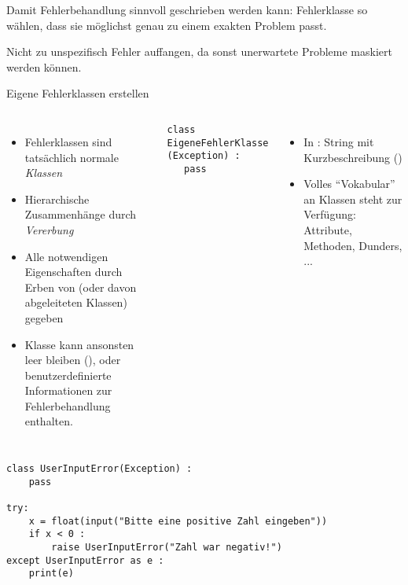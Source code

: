 
\begin{frame}[fragile]{}
%
\begin{hintbox}
Damit Fehlerbehandlung sinnvoll geschrieben werden kann: Fehlerklasse so wählen, dass sie möglichst genau zu einem exakten Problem passt.

Nicht zu unspezifisch Fehler auffangen, da sonst unerwartete Probleme maskiert werden können.
\end{hintbox}
%
\end{frame}


\begin{frame}[fragile]{Eigene Fehlerklassen erstellen}
%
\begin{columns}[T]
\begin{itemize}
\item Fehlerklassen sind tatsächlich normale \emph{Klassen}
\item Hierarchische Zusammenhänge durch \emph{Vererbung}
\item Alle notwendigen Eigenschaften durch Erben von  (oder davon abgeleiteten Klassen) gegeben
\item Klasse kann ansonsten leer bleiben (), oder benutzerdefinierte Informationen zur Fehlerbehandlung enthalten.
\end{itemize}
%
\begin{codebox}
\begin{verbatim}
class EigeneFehlerKlasse (Exception) :
   pass
\end{verbatim}
\end{codebox}
%
\begin{itemize}
\item In : String mit Kurzbeschreibung ()
\item Volles \enquote{Vokabular} an Klassen steht zur Verfügung: Attribute, Methoden, Dunders, ...
\end{itemize}
%
\end{columns}
%
\end{frame}


\begin{frame}[fragile]
%
\begin{codebox}
\begin{verbatim}
class UserInputError(Exception) :
    pass

try:
    x = float(input("Bitte eine positive Zahl eingeben"))
    if x < 0 :
        raise UserInputError("Zahl war negativ!")
except UserInputError as e :
    print(e)
    
\end{verbatim}
\end{codebox}
%
\end{frame}